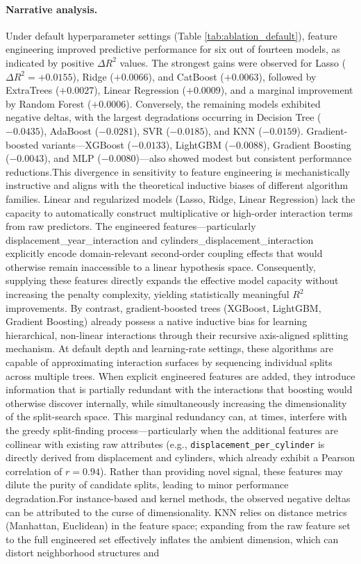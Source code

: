\paragraph{Narrative analysis.}
Under default hyperparameter settings (Table \ref{tab:ablation_default})\cite{atique2026explainable}, feature engineering improved predictive performance for six out of fourteen models, as indicated by positive \(\Delta R^2\) values. The strongest gains were observed for Lasso (\(\Delta R^2 = +0.0155\)), Ridge (\(+0.0066\)), and CatBoost (\(+0.0063\)), followed by ExtraTrees (\(+0.0027\)), Linear Regression (\(+0.0009\)), and a marginal improvement by Random Forest (\(+0.0006\)). Conversely, the remaining models exhibited negative deltas, with the largest degradations occurring in Decision Tree (\(-0.0435\)), AdaBoost (\(-0.0281\)), SVR (\(-0.0185\)), and KNN (\(-0.0159\)). Gradient-boosted variants—XGBoost (\(-0.0133\)), LightGBM (\(-0.0088\)), Gradient Boosting (\(-0.0043\)), and MLP (\(-0.0080\))—also showed modest but consistent performance reductions.This divergence in sensitivity to feature engineering is mechanistically instructive and aligns with the theoretical inductive biases of different algorithm families. Linear and regularized models (Lasso, Ridge, Linear Regression) lack the capacity to automatically construct multiplicative or high-order interaction terms from raw predictors. The engineered features—particularly displacement\_year\_interaction and cylinders\_displacement\_interaction explicitly encode domain-relevant second-order coupling effects that would otherwise remain inaccessible to a linear hypothesis space. Consequently, supplying these features directly expands the effective model capacity without increasing the penalty complexity, yielding statistically meaningful \(R^2\) improvements. By contrast, gradient-boosted trees (XGBoost, LightGBM, Gradient Boosting) already possess a native inductive bias for learning hierarchical, non-linear interactions through their recursive axis-aligned splitting mechanism. At default depth and learning-rate settings, these algorithms are capable of approximating interaction surfaces by sequencing individual splits across multiple trees. When explicit engineered features are added, they introduce information that is partially redundant with the interactions that boosting would otherwise discover internally, while simultaneously increasing the dimensionality of the split-search space. This marginal redundancy can, at times, interfere with the greedy split-finding process—particularly when the additional features are collinear with existing raw attributes (e.g., \texttt{displacement\_per\_cylinder} is directly derived from displacement and cylinders, which already exhibit a Pearson correlation of \(r = 0.94\)). Rather than providing novel signal, these features may dilute the purity of candidate splits, leading to minor performance degradation.For instance-based and kernel methods, the observed negative deltas can be attributed to the curse of dimensionality. KNN relies on distance metrics (Manhattan, Euclidean) in the feature space; expanding from the raw feature set to the full engineered set effectively inflates the ambient dimension, which can distort neighborhood structures and 